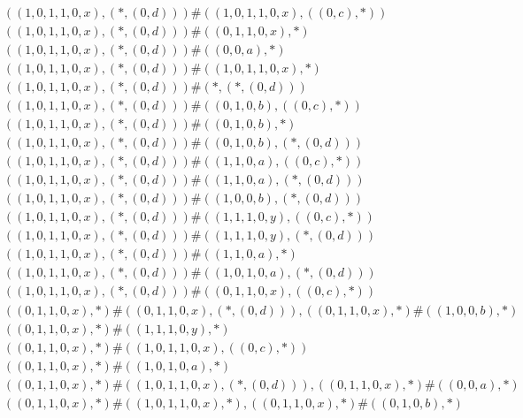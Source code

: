 \begin{align*}
	 & \qquad ((1, 0, 1, 1, 0, x), (*, (0, d))) \# ((1, 0, 1, 1, 0, x), ((0, c), *)) \\ 
	 & \qquad ((1, 0, 1, 1, 0, x), (*, (0, d))) \# ((0, 1, 1, 0, x), *) \\ 
	 & \qquad ((1, 0, 1, 1, 0, x), (*, (0, d))) \# ((0, 0, a), *) \\ 
	 & \qquad ((1, 0, 1, 1, 0, x), (*, (0, d))) \# ((1, 0, 1, 1, 0, x), *) \\ 
	 & \qquad ((1, 0, 1, 1, 0, x), (*, (0, d))) \# (*, (*, (0, d))) \\ 
	 & \qquad ((1, 0, 1, 1, 0, x), (*, (0, d))) \# ((0, 1, 0, b), ((0, c), *)) \\ 
	 & \qquad ((1, 0, 1, 1, 0, x), (*, (0, d))) \# ((0, 1, 0, b), *) \\ 
	 & \qquad ((1, 0, 1, 1, 0, x), (*, (0, d))) \# ((0, 1, 0, b), (*, (0, d))) \\ 
	 & \qquad ((1, 0, 1, 1, 0, x), (*, (0, d))) \# ((1, 1, 0, a), ((0, c), *)) \\ 
	 & \qquad ((1, 0, 1, 1, 0, x), (*, (0, d))) \# ((1, 1, 0, a), (*, (0, d))) \\ 
	 & \qquad ((1, 0, 1, 1, 0, x), (*, (0, d))) \# ((1, 0, 0, b), (*, (0, d))) \\ 
	 & \qquad ((1, 0, 1, 1, 0, x), (*, (0, d))) \# ((1, 1, 1, 0, y), ((0, c), *)) \\ 
	 & \qquad ((1, 0, 1, 1, 0, x), (*, (0, d))) \# ((1, 1, 1, 0, y), (*, (0, d))) \\ 
	 & \qquad ((1, 0, 1, 1, 0, x), (*, (0, d))) \# ((1, 1, 0, a), *) \\ 
	 & \qquad ((1, 0, 1, 1, 0, x), (*, (0, d))) \# ((1, 0, 1, 0, a), (*, (0, d))) \\ 
	 & \qquad ((1, 0, 1, 1, 0, x), (*, (0, d))) \# ((0, 1, 1, 0, x), ((0, c), *)) \\ 
	 & \qquad ((0, 1, 1, 0, x), *) \# ((0, 1, 1, 0, x), (*, (0, d))), ((0, 1, 1, 0, x), *) \# ((1, 0, 0, b), *) \\ 
	 & \qquad ((0, 1, 1, 0, x), *) \# ((1, 1, 1, 0, y), *) \\ 
	 & \qquad ((0, 1, 1, 0, x), *) \# ((1, 0, 1, 1, 0, x), ((0, c), *)) \\ 
	 & \qquad ((0, 1, 1, 0, x), *) \# ((1, 0, 1, 0, a), *) \\ 
	 & \qquad ((0, 1, 1, 0, x), *) \# ((1, 0, 1, 1, 0, x), (*, (0, d))), ((0, 1, 1, 0, x), *) \# ((0, 0, a), *) \\ 
	 & \qquad ((0, 1, 1, 0, x), *) \# ((1, 0, 1, 1, 0, x), *), ((0, 1, 1, 0, x), *) \# ((0, 1, 0, b), *) \\ 

\end{align*}
